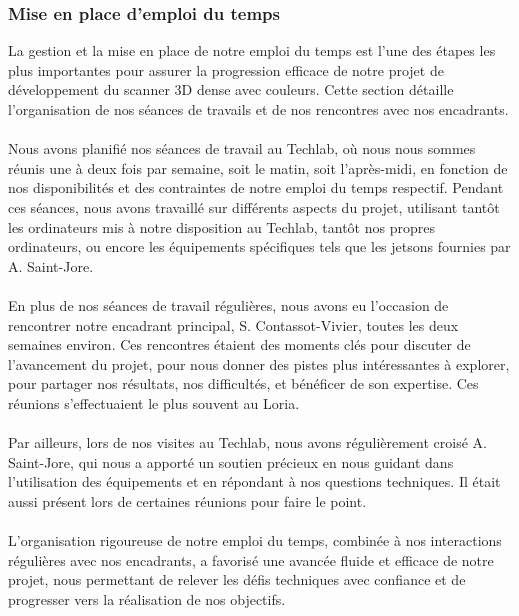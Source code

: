     \subsubsection{Mise en place d'emploi du temps}
        \normalsize{
            La gestion et la mise  en place de notre emploi du temps est l'une des étapes les plus importantes pour assurer la progression efficace de notre projet de développement du scanner 3D dense avec couleurs. Cette section détaille l'organisation de nos séances de travails et de nos rencontres avec nos encadrants.
        }
        \\ \\
        \normalsize{
            Nous avons planifié nos séances de travail au Techlab, où nous nous sommes réunis une à deux fois par semaine, soit le matin, soit l'après-midi, en fonction de nos disponibilités et des contraintes de notre emploi du temps respectif. Pendant ces séances, nous avons travaillé sur différents aspects du projet, utilisant tantôt les ordinateurs mis à notre disposition au Techlab, tantôt nos propres ordinateurs, ou encore les équipements spécifiques tels que les jetsons fournies par A. Saint-Jore.
        }
        \\ \\
        \normalsize{
            En plus de nos séances de travail régulières, nous avons eu l'occasion de rencontrer notre encadrant principal, S. Contassot-Vivier, toutes les deux semaines environ. Ces rencontres étaient des moments clés pour discuter de l'avancement du projet, pour nous donner des pistes plus intéressantes à explorer, pour partager nos résultats, nos difficultés, et bénéficer de son expertise. Ces réunions s'effectuaient le plus souvent au Loria.
        }
        \\ \\
        \normalsize{
            Par ailleurs, lors de nos visites au Techlab, nous avons régulièrement croisé A. Saint-Jore, qui nous a apporté un soutien précieux en nous guidant dans l'utilisation des équipements et en répondant à nos questions techniques. Il était aussi présent lors de certaines réunions pour faire le point.
        }
        \\ \\
        \normalsize{
            L'organisation rigoureuse de notre emploi du temps, combinée à nos interactions régulières avec nos encadrants, a favorisé une avancée fluide et efficace de notre projet, nous permettant de relever les défis techniques avec confiance et de progresser vers la réalisation de nos objectifs.
        }


